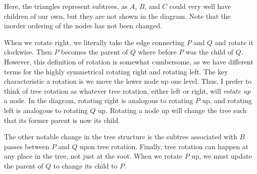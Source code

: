 Here, the triangles represent subtrees, as $A$, $B$, and $C$ could very well have children of our own, but they are not shown in the diagram. Note that the inorder ordering of the nodes has not been changed.

When we rotate right, we literally take the edge connecting $P$ and $Q$ and rotate it clockwise. Then $P$ becomes the parent of $Q$ where before $P$ was the child of $Q$. However, this definition of rotation is somewhat cumbersome, as we have different terms for the highly symmetrical rotating right and rotating left. The key characteristic a rotation is we move the lower node up one level. Thus, I prefer to think of tree rotation as whatever tree rotation, either left or right, will \textit{rotate up} a node. In the diagram, rotating right is analogous to rotating $P$ up, and rotating left is analogous to rotating $Q$ up. Rotating a node up will change the tree such that its former parent is now its child.

The other notable change in the tree structure is the subtree associated with $B$ passes between $P$ and $Q$ upon tree rotation. Finally, tree rotation can happen at any place in the tree, not just at the root. When we rotate $P$ up, we must update the parent of $Q$ to change its child to $P$.

\begin{center}
\end{center}

